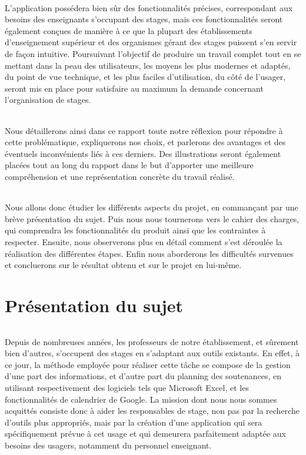 \documentclass[a4paper,10pt]{report}
\begin{document}
  \paragraph{}
    L'application possédera bien sûr des fonctionnalités précises, correspondant aux besoins des enseignants s'occupant des stages, mais ces fonctionnalités seront également conçues de manière à ce que la plupart des établissements d'enseignement supérieur et des organismes gérant des stages puissent s'en servir de façon intuitive. 
    Poursuivant l'objectif de produire un travail complet tout en se mettant dans la peau des utilisateurs, les moyens les plus modernes et adaptés, du point de vue technique, et les plus faciles d'utilisation, du côté de l'usager, seront mis en place pour satisfaire au maximum la demande concernant l'organisation de stages. 

  \paragraph{}
    Nous détaillerons ainsi dans ce rapport toute notre réflexion pour répondre à cette problématique, expliquerons nos choix, et parlerons des avantages et des éventuels inconvénients liés à ces derniers.  
    Des illustrations seront également placées tout au long du rapport dans le but d'apporter une meilleure compréhension et une représentation concrète du travail réalisé.
    
  \paragraph{}
    Nous allons donc étudier les différents aspects du projet, en commançant par une brève présentation du sujet. 
    Puis nous nous tournerons vers le cahier des charges, qui comprendra les fonctionnalités du produit ainsi que les contraintes à respecter.
    Ensuite, nous observerons plus en détail comment s'est déroulée la réalisation des différentes étapes.
    Enfin nous aborderons les difficultés survenues et concluerons sur le résultat obtenu et sur le projet en lui-même.



\part{Présentation du sujet}
  \paragraph{}
    Depuis de nombreuses années, les professeurs de notre établissement, et sûrement bien d'autres, s'occupent des stages en s'adaptant aux outils existants.
    En effet, à ce jour, la méthode employée pour réaliser cette tâche se compose de la gestion d'une part des informations, et d'autre part du planning des soutenances, en utilisant respectivement des logiciels tels que Microsoft Excel, et les fonctionnalités de calendrier de Google.
    La mission dont nous nous sommes acquittés consiste donc à aider les responsables de stage, non pas par la recherche d'outils plus appropriés, mais par la création d'une application qui sera spécifiquement prévue à cet usage et qui demeurera parfaitement adaptée aux besoins des usagers, notamment du personnel enseignant.
\end{document}
